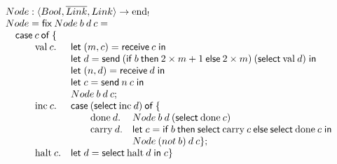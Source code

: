 \documentclass[orivec,envcountsame]{llncs}
\newcommand{\gvdual}[1]{\overline{#1}}
\newcommand{\uto}{\ensuremath{\rightarrow}}
\newcommand{\outterm}{\mathrm{end}_!}
\newcommand{\mkwd}[1]{\mathsf{#1}}
\newcommand{\clabel}[1]{\mathrm{#1}}
\newcommand{\gvsend}[2]{\mkwd{send}\:#1\:#2}
\newcommand{\gvreceive}[1]{\mkwd{receive}\:#1}
\newcommand{\gvlet}[3]{\mkwd{let}\;#1 = #2\;\mkwd{in}\;#3}
\newcommand{\gvselect}[2]{\mkwd{select}\:#1\:#2}
\newcommand{\lrkwd}{\mkwd{fix}}
\begin{document}
\[\begin{array}{lllll}
\mcl{5}{Node : \langle Bool, \gvdual{Link}, Link \rangle \uto \outterm} \\
\mcl{5}{Node = \lrkwd\:Node\:b\:d\:c =} \\
\mcl{5}{\quad \mkwd{case}\:c\:\mkwd{of}\:\{} \\
\quad \quad & \clabel{val}\:c. & \mcl{3}{\gvlet{(m,c)}{\gvreceive{c}}{}} \\
& & \mcl{3}{\gvlet{d}{\gvsend{(\gvifthen{b}{2 \times m + 1}{2 \times m})}{(\gvselect{\clabel{val}}{d})}}{}} \\
& & \mcl{3}{\gvlet{(n,d)}{\gvreceive{d}}{}} \\
& & \mcl{3}{\gvlet{c}{\gvsend{n}{c}}{}} \\
& & \mcl{3}{Node\:b\:d\:c;} \\
& \clabel{inc}\:c. & \mcl{3}{\mkwd{case}\:(\gvselect{\clabel{inc}}{d})\:\mkwd{of}\:\{} \\
& & \quad & \clabel{done}\:d. & Node\:b\:d\:(\gvselect{\clabel{done}}{c}) \\
& & & \clabel{carry}\:d. & \gvlet{c}{\gvifthen{b}{\gvselect{\clabel{carry}}{c}}{\gvselect{\clabel{done}}{c}}}{} \\
& & & & Node\:(not\:b)\:d\:c \}; \\
& \clabel{halt}\:c. & \mcl{3}{\gvlet{d}{\gvselect{\clabel{halt}}{d}}{c} \}}
\end{array}\]
\end{document}
